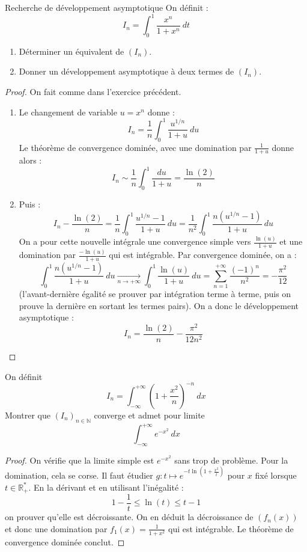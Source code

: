 \documentclass[french,a4paper]{article}
\newcommand{\N}{\mathbb{N}}
\newcommand{\R}{\mathbb{R}}
\newcommand{\st}{^*}
\theoremstyle{plain}
\theoremstyle{definition}
\theoremstyle{remark}
\begin{document}
\begin{ex}[Moulin.IP.03]{Recherche de développement asymptotique}
	On définit : $$I_n=\int_{0}^{1}\frac{x^n}{1+x^n}\ dt$$
	\begin{enumerate}
		\item Déterminer un équivalent de $(I_n)$.
		\item Donner un développement asymptotique à deux termes de $(I_n)$.
	\end{enumerate}
\end{ex}
\begin{proof}
	On fait comme dans l'exercice précédent.
	\begin{enumerate}
		\item Le changement de variable $u=x^n$ donne : $$I_n=\frac{1}{n}\int_{0}^{1}\frac{u^{1/n}}{1+u}\ du$$ Le théorème de convergence dominée, avec une domination par $\displaystyle\frac{1}{1+u}$ donne alors : $$I_n\sim\frac{1}{n}\int_{0}^{1}\frac{du}{1+u}=\frac{\ln(2)}{n}$$
		\item Puis : $$I_n-\frac{\ln(2)}{n}=\frac{1}{n}\int_{0}^{1}\frac{u^{1/n}-1}{1+u}\ du=\frac{1}{n^2}\int_{0}^{1}\frac{n(u^{1/n}-1)}{1+u}\ du$$ On a pour cette nouvelle intégrale une convergence simple vers $\displaystyle\frac{\ln(u)}{1+u}$ et une domination par $\displaystyle\frac{-\ln(u)}{1+u}$ qui est intégrable. Par convergence dominée, on a : $$\int_{0}^{1}\frac{n(u^{1/n}-1)}{1+u}\ du\xrightarrow[n\to+\infty]{}\int_{0}^{1}\frac{\ln(u)}{1+u}\ du=\sum_{n=1}^{+\infty}\frac{(-1)^n}{n^2}=-\frac{\pi^2}{12}$$ (l'avant-dernière égalité se prouver par intégration terme à terme, puis on prouve la dernière en sortant les termes pairs). On a donc le développement asymptotique : $$I_n=\frac{\ln(2)}{n}-\frac{\pi^2}{12n^2}$$
	\end{enumerate}
\end{proof}

\begin{ex}[Moulin.IP.04]{}
	On définit $$I_n=\int_{-\infty}^{+\infty}\left(1+\frac{x^2}{n}\right)^{-n}\ dx$$ Montrer que $(I_n)_{n\in\N}$ converge et admet pour limite $$\int_{-\infty}^{+\infty}e^{-x^2}\ dx$$
\end{ex}
\begin{proof}
	On vérifie que la limite simple est $e^{-x^2}$ sans trop de problème. Pour la domination, cela se corse. Il faut étudier $g:t\mapsto\displaystyle e^{-t\ln\left(1+\frac{x^2}{t}\right)}$ pour $x$ fixé lorsque $t\in\R_+\st$. En la dérivant et en utilisant l'inégalité : $$1-\frac{1}{t}\leqslant\ln(t)\leqslant t-1$$ on prouver qu'elle est décroissante. On en déduit la décroissance de $(f_n(x))$ et donc une domination par $f_1(x)=\displaystyle\frac{1}{1+x^2}$ qui est intégrable. Le théorème de convergence dominée conclut.
\end{proof}
\end{document}

